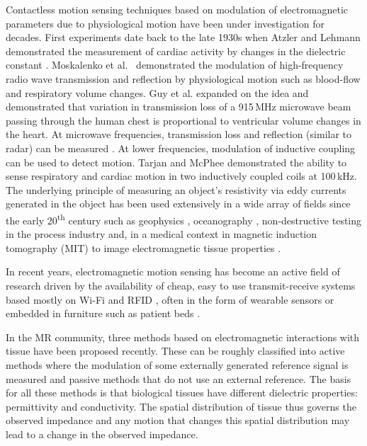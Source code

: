 \documentclass[
]{article}
\begin{document}
Contactless motion sensing techniques based on modulation of
electromagnetic parameters due to physiological motion have been under
investigation for decades. First experiments date back to the late 1930s when Atzler and Lehmann demonstrated the measurement of cardiac activity by changes in the dielectric constant \cite{Atzler1932UberDielektrographie}. Moskalenko et al.\ \cite{Moskalenko1960, Moskalenko1958}
demonstrated the modulation of high-frequency radio wave transmission
and reflection by physiological motion such as blood-flow and
respiratory volume changes. Guy et al. \cite{Johnson1972} expanded on the idea and
demonstrated that variation in transmission loss of a 915\,MHz microwave
beam passing through the human chest is proportional to ventricular
volume changes in the heart. At microwave frequencies, transmission loss
and reflection (similar to radar) can be measured \cite{Matsumoto2016HEARTBEATANALYSIS, Pfanner2014, Pfanner2013}. At lower
frequencies, modulation of inductive coupling can be used to detect
motion. Tarjan and McPhee \cite{Tarjan1968ElectrodelessInduction} demonstrated the ability to sense respiratory and cardiac motion in two inductively coupled coils at
100\,kHz. The underlying principle of measuring an object's resistivity via
eddy currents generated in the object has been used extensively in a
wide array of fields since the early 20\textsuperscript{th} century such
as geophysics \cite{Slichter1933TheStructures, Everett2012TheoreticalSurface}, oceanography \cite{Striggow1985TheApplication}, non-destructive
testing in the process industry \cite{Garcia-Martin2011Non-destructiveTesting, Sureshkumar2013UtilizationFBRs, Kumar2016TowardsModel} and, in a medical context in
magnetic induction tomography (MIT) to image electromagnetic tissue
properties \cite{Griffiths1999MagneticTissues}.

In recent years, electromagnetic motion sensing has become an active
field of research driven by the availability of cheap, easy to use
transmit-receive systems based mostly on Wi-Fi \cite{Liu2016ContactlessDevices, Yang2018Multi-personDevices} and RFID
\cite{Hui2018MonitoringSensing, Liu2019VitalChallenges}, often in the form of wearable sensors \cite{Teichmann2014TheArray, Teichmann2010RespirationCoil} or
embedded in furniture such as patient beds \cite{Mahdavi2017In-bedGradiometer}.

In the MR community, three methods based on electromagnetic interactions
with tissue have been proposed recently. These can be roughly classified
into active methods where the modulation of some externally generated reference
signal is measured and passive methods that do not use an external
reference. The basis for all these methods is that biological tissues
have different dielectric properties: permittivity and conductivity. The
spatial distribution of tissue thus governs the observed impedance and
any motion that changes this spatial distribution may lead to a change
in the observed impedance.
\end{document}
